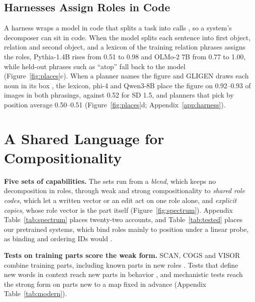 \documentclass{article}
\theoremstyle{plain}
\theoremstyle{remark}
\begin{document}
\subsection{Harnesses Assign Roles in Code}
\label{sec:harness}

A harness wraps a model in code that splits a task into calls \citep{zhang2025rlm,zhang2026harness}, so a system's decomposer can sit in code. When the model splits each sentence into first object, relation and second object, and a lexicon of the training relation phrases assigns the roles, Pythia-1.4B rises from 0.51 to 0.98 and OLMo-2 7B from 0.77 to 1.00, while held-out phrases such as ``atop'' fall back to the model (Figure~\ref{fig:places}c). When a planner names the figure and GLIGEN draws each noun in its box \citep{li2023gligen,lian2024llmgrounded}, the lexicon, phi-4 and Qwen3-8B place the figure on 0.92--0.93 of images in both phrasings, against 0.52 for SD 1.5, and planners that pick by position average 0.50--0.51 (Figure~\ref{fig:places}d; Appendix~\ref{app:harness}).

\section{A Shared Language for Compositionality}
\label{sec:spectrum}


\textbf{Five sets of capabilities.}\label{sec:sets} The sets run from a \emph{blend}, which keeps no decomposition in roles, through weak and strong compositionality to \emph{shared role codes}, which let a written vector or an edit act on one role alone, and \emph{explicit copies}, whose role vector is the part itself \citep{fodor1988} (Figure~\ref{fig:spectrum}). Appendix Table~\ref{tab:spectrum} places twenty-two accounts, and Table~\ref{tab:tested} places our pretrained systems, which bind roles mainly to position under a linear probe, as binding and ordering IDs would \citep{feng2024,dai2024binding,gurarieh2026mixing}.

\textbf{Tests on training parts score the weak form.} SCAN, COGS and VISOR combine training parts, including known parts in new roles \citep{lake2018,kim2020cogs,gokhale2022visor}. Tests that define new words in context reach new parts in behavior \citep{lake2023}, and mechanistic tests \citep{geiger2021,mccoy2019} reach the strong form on parts new to a map fixed in advance (Appendix Table~\ref{tab:modern}).
\end{document}
